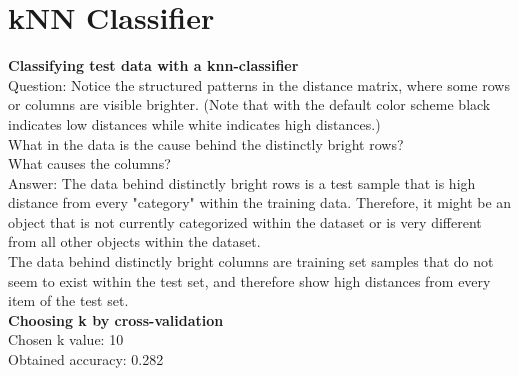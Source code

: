 \documentclass[12pt]{article}
\begin{document}
\section*{kNN Classifier}
\textbf{Classifying test data with a knn-classifier}\\
Question: Notice the structured patterns in the distance matrix, where some rows or columns are visible brighter. (Note that with the default color scheme black indicates low distances while white indicates high distances.)\\

What in the data is the cause behind the distinctly bright rows?\\
What causes the columns?\\
Answer: The data behind distinctly bright rows is a test sample that is high distance from every "category" within the training data. Therefore, it might be an object that is not currently categorized within the dataset or is very different from all other objects within the dataset.\\

The data behind distinctly bright columns are training set samples that do not seem to exist within the test set, and therefore show high distances from every item of the test set.\\

\textbf{Choosing k by cross-validation}\\
Chosen k value: 10\\
Obtained accuracy: 0.282\\
\end{document}
